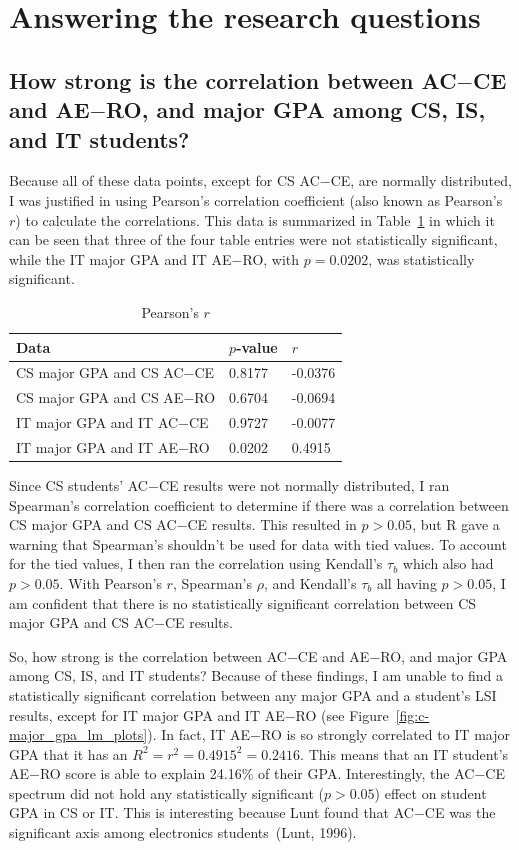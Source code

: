 \section{Answering the research questions}
\subsection{How strong is the correlation between AC$-$CE and AE$-$RO, and major GPA among CS, IS, and IT students?}
Because all of these data points, except for CS AC$-$CE, are normally distributed, I was justified in using Pearson's correlation coefficient (also known as Pearson's $r$) to calculate the correlations. This data is summarized in Table~\ref{tab:c-pearsons} in which it can be seen that three of the four table entries were not statistically significant, while the IT major GPA and IT AE$-$RO, with $p=0.0202$, was statistically significant.

\begin{table}[!htbp]
  \centering
  \caption{Pearson's $r$}
  \label{tab:c-pearsons}
  \begin{tabular}{lll}
    \toprule
    Data                      & $p$-value & $r$ \\
    \midrule
    CS major GPA and CS AC$-$CE & 0.8177    & -0.0376 \\
    CS major GPA and CS AE$-$RO & 0.6704    & -0.0694 \\
    IT major GPA and IT AC$-$CE & 0.9727    & -0.0077 \\
    IT major GPA and IT AE$-$RO & 0.0202    &  0.4915 \\
    \bottomrule
  \end{tabular}
\end{table}

Since CS students' AC$-$CE results were not normally distributed, I ran Spearman's correlation coefficient to determine if there was a correlation between CS major GPA and CS AC$-$CE results. This resulted in $p>0.05$, but R gave a warning that Spearman's shouldn't be used for data with tied values. To account for the tied values, I then ran the correlation using Kendall's $\tau_b$ which also had $p>0.05$. With Pearson's $r$, Spearman's $\rho$, and Kendall's $\tau_b$ all having $p>0.05$, I am confident that there is no statistically significant correlation between CS major GPA and CS AC$-$CE results.

So, how strong is the correlation between AC$-$CE and AE$-$RO, and major GPA among CS, IS, and IT students? Because of these findings, I am unable to find a statistically significant correlation between any major GPA and a student's LSI results, except for IT major GPA and IT AE$-$RO (see Figure~\ref{fig:c-major_gpa_lm_plots}). In fact, IT AE$-$RO is so strongly correlated to IT major GPA that it has an $R^2=r^2=0.4915^2=0.2416$. This means that an IT student's AE$-$RO score is able to explain 24.16\% of their GPA. Interestingly, the AC$-$CE spectrum did not hold any statistically significant ($p>0.05$) effect on student GPA in CS or IT. This is interesting because Lunt found that AC$-$CE was the significant axis among electronics students~(Lunt, 1996).

